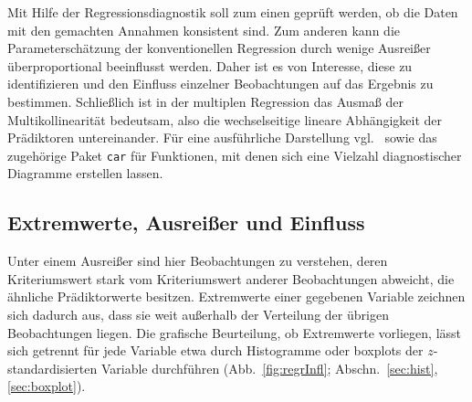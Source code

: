 Mit Hilfe der Regressionsdiagnostik soll zum einen geprüft werden, ob die Daten mit den gemachten Annahmen konsistent sind. Zum anderen kann die Parameterschätzung der konventionellen Regression durch wenige Ausreißer überproportional beeinflusst werden. Daher ist es von Interesse, diese zu identifizieren und den Einfluss einzelner Beobachtungen auf das Ergebnis zu bestimmen. Schließlich ist in der multiplen Regression das Ausmaß der Multikollinearität bedeutsam, also die wechselseitige lineare Abhängigkeit der Prädiktoren untereinander. Für eine ausführliche Darstellung vgl.\  sowie das zugehörige Paket \lstinline!car! für Funktionen, mit denen sich eine Vielzahl diagnostischer Diagramme erstellen lassen.

\subsection{Extremwerte, Ausreißer und Einfluss}
\label{sec:regrInfluence}

Unter einem Ausreißer sind hier Beobachtungen zu verstehen, deren Kriteriumswert stark vom Kriteriumswert anderer Beobachtungen abweicht, die ähnliche Prädiktorwerte besitzen. Extremwerte einer gegebenen Variable zeichnen sich dadurch aus, dass sie weit außerhalb der Verteilung der übrigen Beobachtungen liegen. Die grafische Beurteilung, ob Extremwerte vorliegen, lässt sich getrennt für jede Variable etwa durch Histogramme oder boxplots der $z$-standardisierten Variable durchführen (Abb.\ \ref{fig:regrInfl}; Abschn.\ \ref{sec:hist}, \ref{sec:boxplot}).

